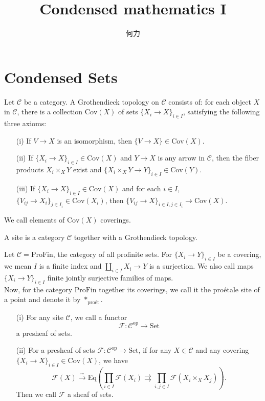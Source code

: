 \documentclass[UTF8,12,a4paper]{ctexart}
\theoremstyle{definition}
\begin{document}
\title{\vspace{-6em}\Large{Condensed mathematics I}}
\date{}
\author{何力}
\maketitle	
\section{Condensed Sets}
\dfn 
Let $\mathcal{C}$ be a category. A Grothendieck topology on $\mathcal{C}$ consists of: for each object $X$ in $\mathcal{C}$, there is a collection $\text{Cov}(X)$ of sets $\{X_i\to X\}_{i\in I}$, satisfying the following three axioms:
\begin{itemize}
	\item [(i)] If $V\to X$ is an isomorphism, then $\{V\to X\}\in \text{Cov}(X).$
	\item [(ii)] If $\{X_i\to X\}_{i\in I}\in \text{Cov}(X)$ and $Y\to X$ is any arrow in $\mathcal{C}$, then the fiber products $X_i\times_{X} Y$ exist and $\{X_i\times_{X} Y\to Y\}_{i\in I}\in \text{Cov}(Y).$
	\item [(iii)] If $\{X_i\to X\}_{i\in I}\in \text{Cov}(X)$ and for each $i\in I$, $\{V_{ij}\to X_i\}_{j\in I_i}\in \text{Cov}(X_i)$, then $\{V_{ij}\to X\}_{i\in I, j\in I_i}\to \text{Cov}(X).$
\end{itemize}
We call elements of $\text{Cov}(X)$ coverings.

\dfn 
A site is a category $\mathcal{C}$ together with a Grothendieck topology.

\exm 
Let $\mathcal{C}=\text{ProFin}$, the category of all profinite sets. For $\{X_i\to Y\}_{i\in I}$ be a covering, we mean $I$ is a finite index and $\coprod_{i\in I} X_i\to Y$ is a surjection. We also call maps $\{X_i\to Y\}_{i\in I}$ finite jointly surjective families of maps.\\
Now, for the category $\text{ProFin}$ together its coverings, we call it the pro\'etale site of a point and denote it by $*_{\text{pro\'et}}$.

\dfn 
\begin{itemize}
	\item [(i)] For any site $\mathcal{C}$, we call a functor 
	$$\mathcal{F}:\mathcal{C}^\text{op}\rightarrow\text{Set}$$
	a presheaf of sets.
	\item [(ii)] For a presheaf of sets $\mathcal{F}:\mathcal{C}^\text{op}\rightarrow\text{Set}$, if for any $X\in\mathcal{C}$ and any covering $\{X_i\to X\}_{i\in I}\in \text{Cov}(X)$, we have
	$$
	\mathcal{F}(X)\stackrel{\sim}{\longrightarrow}\text{Eq}(\prod_{i\in I}\mathcal{F}(X_i)\rightrightarrows \prod_{i,j\in I}\mathcal{F}(X_i\times_{X} X_j)).
	$$
	Then we call $\mathcal{F}$ a sheaf of sets.
\end{itemize}
\end{document}
